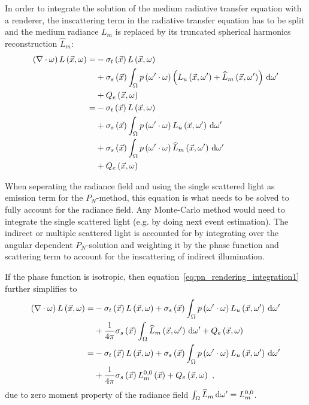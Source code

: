 In order to integrate the solution of the medium radiative transfer equation with a renderer, the inscattering term in the radiative transfer equation has to be split and the medium radiance $L_m$ is replaced by its truncated spherical harmonics reconstruction $\widehat{L}_m$:
\begin{align}
\left(\nabla\cdot\omega\right)L\left(\vec{x}, \omega \right)
=&
-\sigma_t\left(\vec{x}\right) L\left(\vec{x}, \omega \right)\nonumber\\
&
+\sigma_s\left(\vec{x}\right) \int_{\Omega}
{
p\left(\omega'\cdot\omega\right)\left(L_u\left(\vec{x}, \omega' \right)+\widehat{L}_m\left(\vec{x}, \omega' \right)\right)\,\mathrm{d}\omega'
}
\nonumber
\\
&
+Q_e\left(\vec{x}, \omega\right)
\nonumber
\\
=&
-\sigma_t\left(\vec{x}\right) L\left(\vec{x}, \omega \right)
\nonumber\\
&
+\sigma_s\left(\vec{x}\right) \int_{\Omega}
{
p\left(\omega'\cdot\omega\right)L_u\left(\vec{x}, \omega' \right)\,\mathrm{d}\omega'
}
\nonumber\\
&
+\sigma_s\left(\vec{x}\right) \int_{\Omega}
{
p\left(\omega'\cdot\omega\right)\widehat{L}_m\left(\vec{x}, \omega' \right)\,\mathrm{d}\omega'
}
\nonumber\\
&
+Q_e\left(\vec{x}, \omega\right)
\label{eq:pn_rendering_integration1}
\end{align}

When seperating the radiance field and using the single scattered light as emission term for the $P_N$-method, this equation is what needs to be solved to fully account for the radiance field. Any Monte-Carlo method would need to integrate the single scattered light (e.g. by doing next event estimation). The indirect or multiple scattered light is accounted for by integrating over the angular dependent $P_N$-solution and weighting it by the phase function and scattering term to account for the inscattering of indirect illumination.

If the phase function is isotropic, then equation~\ref{eq:pn_rendering_integration1} further simplifies to
\begin{align}
\left(\nabla\cdot\omega\right)L\left(\vec{x}, \omega \right)
=&
-\sigma_t\left(\vec{x}\right) L\left(\vec{x}, \omega \right)
+\sigma_s\left(\vec{x}\right) \int_{\Omega}
{
p\left(\omega'\cdot\omega\right)L_u\left(\vec{x}, \omega' \right)\,\mathrm{d}\omega'
}
\nonumber\\
&
+
\frac{1}{4\pi}
\sigma_s\left(\vec{x}\right)
\int_{\Omega}
{
\widehat{L}_m\left(\vec{x}, \omega' \right)\,\mathrm{d}\omega'
}
+Q_e\left(\vec{x}, \omega\right)
\nonumber\\
=&
-\sigma_t\left(\vec{x}\right) L\left(\vec{x}, \omega \right)
+\sigma_s\left(\vec{x}\right) \int_{\Omega}
{
p\left(\omega'\cdot\omega\right)L_u\left(\vec{x}, \omega' \right)\,\mathrm{d}\omega'
}
\nonumber\\
&
+
\frac{1}{4\pi}
\sigma_s\left(\vec{x}\right)
L_m^{0,0}\left(\vec{x}\right)
+Q_e\left(\vec{x}, \omega\right)
\ ,
\label{eq:pn_rendering_integration2}
\end{align}
due to zero moment property of the radiance field $\int_{\Omega}\widehat{L}_m\,\mathrm{d}\omega'=L_m^{0,0}$.

